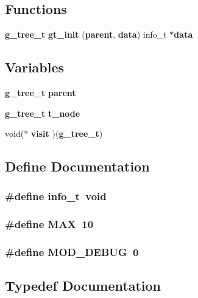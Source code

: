 \subsection*{Functions}
\begin{CompactItemize}
\item 
{\bf g\_\-tree\_\-t} {\bf gt\_\-init} ({\bf parent}, {\bf data}) info\_\-t $\ast${\bf data}
\end{CompactItemize}
\subsection*{Variables}
\begin{CompactItemize}
\item 
{\bf g\_\-tree\_\-t} {\bf parent}
\item 
{\bf g\_\-tree\_\-t} {\bf t\_\-node}
\item 
void($\ast$ {\bf visit} )({\bf g\_\-tree\_\-t})
\end{CompactItemize}


\subsection{Define Documentation}
\subsubsection{\setlength{\rightskip}{0pt plus 5cm}\#define info\_\-t\ void}\label{P__gtree_8c_a1}


\subsubsection{\setlength{\rightskip}{0pt plus 5cm}\#define MAX\ 10}\label{P__gtree_8c_a2}


\subsubsection{\setlength{\rightskip}{0pt plus 5cm}\#define MOD\_\-DEBUG\ 0}\label{P__gtree_8c_a0}




\subsection{Typedef Documentation}
